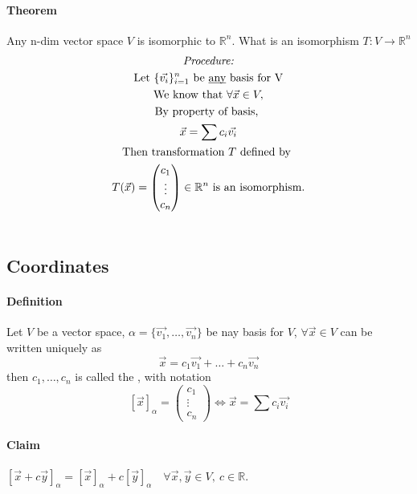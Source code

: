 \documentclass[11pt]{article}
\begin{document}
	\paragraph{Theorem} Any n-dim vector space $V$ is isomorphic to $\mathbb{R}^n$.
	What is an isomorphism $T: V \to \mathbb{R}^n$
	\begin{multline*}
		\emph{Procedure:} \\
		\text{Let } \{\vec{v_i}\}_{i=1}^n \text{ be \underbar{any} basis for } $V$ \\
		\text{We know that } \forall \vec{x} \in V, \\
		\text{By property of basis, } \\
		\vec{x} = \sum{c_i \vec{v_i}} \\
		\text{Then transformation $T$ defined by }\\
		T(\vec{x}) = \begin{pmatrix}
			c_1 \\
			\vdots \\
			c_n \\
		\end{pmatrix} \in \mathbb{R}^n \text{ is an isomorphism.}\\
		\\
	\end{multline*}
	
	\subsection{Coordinates}
	\paragraph{Definition} Let $V$ be a vector space, $\alpha = \{\vec{v_1}, \dots, \vec{v_n}\}$ be nay basis for $V$, $\forall \vec{x} \in V$ can be written uniquely as 
	\[
		\vec{x} = c_1 \vec{v_1} + \dots + c_n \vec{v_n}
	\]
	then $c_1,\dots,c_n$ is called the 
	, with notation
	\[
	[\vec{x}]_{\alpha} = \begin{pmatrix}
		c_1 \\
		\vdots \\
		c_n
	\end{pmatrix} \iff \vec{x} = \sum{c_i\vec{v_i}}
	\]
	\paragraph{Claim} $[\vec{x} + c\vec{y}]_{\alpha} = [\vec{x}]_{\alpha} + c[\vec{y}]_{\alpha}\quad \forall \vec{x},\vec{y} \in V,\ c \in \mathbb{R}$.
	
\end{document}

